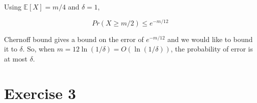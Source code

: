 \documentclass[12pt, a4paper]{article} %
\newcommand\expect[1]{\mathbb{E}[#1]}
\begin{document}
\begin{enumerate}[label=(\alph*)]
    Using $\expect{X} = m/4$ and $\delta = 1$,

    \begin{equation*}
      Pr(X \ge m/2) \le e^{-m/12}
    \end{equation*}

    Chernoff bound gives a bound on the error of $e^{-m/12}$ and we would like to bound it to $\delta$. So, when $m = 12 \ln (1/\delta) = O(\ln (1/\delta))$, the probability of error is at most $\delta$.
\end{enumerate}


\section*{Exercise 3}%
\label{sec:exercise_3}
\end{document}

